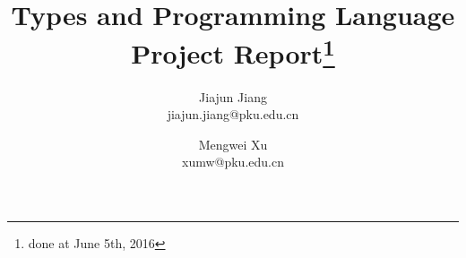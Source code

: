 \documentclass[a4paper,11pt]{article}
\begin{document}
    \title{Types and Programming Language Project Report\footnote{done at June 5th, 2016}}
    \author{Jiajun Jiang\\ jiajun.jiang@pku.edu.cn\\ 
        \and 
        Mengwei Xu\\ 
        xumw@pku.edu.cn\\ 
    } 
    \date{}
    \maketitle


    













 
\end{document}
